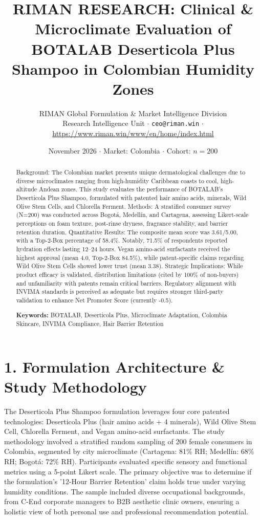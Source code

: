 \documentclass[10pt,twocolumn,a4paper]{article}
\title{\textbf{RIMAN RESEARCH: Clinical \& Microclimate Evaluation of BOTALAB Deserticola Plus Shampoo in Colombian Humidity Zones}}
\author{RIMAN Global Formulation \& Market Intelligence Division\\
\small Research Intelligence Unit $\cdot$ \texttt{ceo@riman.win} $\cdot$ \url{https://www.riman.win/www/en/home/index.html}}
\date{November 2026 \quad $\cdot$ \quad Market: Colombia \quad $\cdot$ \quad Cohort: $n = 200$}
\begin{document}
\maketitle

\begin{abstract}
Background: The Colombian market presents unique dermatological challenges due to diverse microclimates ranging from high-humidity Caribbean coasts to cool, high-altitude Andean zones. This study evaluates the performance of BOTALAB's Deserticola Plus Shampoo, formulated with patented hair amino acids, minerals, Wild Olive Stem Cells, and Chlorella Ferment. Methods: A stratified consumer survey (N=200) was conducted across Bogotá, Medellín, and Cartagena, assessing Likert-scale perceptions on foam texture, post-rinse dryness, fragrance stability, and barrier retention duration. Quantitative Results: The composite mean score was 3.61/5.00, with a Top-2-Box percentage of 58.4\%. Notably, 71.5\% of respondents reported hydration effects lasting 12–24 hours. Vegan amino-acid surfactants received the highest approval (mean 4.0, Top-2-Box 84.5\%), while patent-specific claims regarding Wild Olive Stem Cells showed lower trust (mean 3.38). Strategic Implications: While product efficacy is validated, distribution limitations (cited by 100\% of non-buyers) and unfamiliarity with patents remain critical barriers. Regulatory alignment with INVIMA standards is perceived as adequate but requires stronger third-party validation to enhance Net Promoter Score (currently -0.5).

\vspace{0.4em}
\noindent\textbf{Keywords:} BOTALAB, Deserticola Plus, Microclimate Adaptation, Colombia Skincare, INVIMA Compliance, Hair Barrier Retention
\end{abstract}

\section{1. Formulation Architecture \& Study Methodology}
The Deserticola Plus Shampoo formulation leverages four core patented technologies: Deserticola Plus (hair amino acids + 4 minerals), Wild Olive Stem Cell, Chlorella Ferment, and Vegan amino-acid surfactants. The study methodology involved a stratified random sampling of 200 female consumers in Colombia, segmented by city microclimate (Cartagena: 81\% RH; Medellín: 68\% RH; Bogotá: 72\% RH). Participants evaluated specific sensory and functional metrics using a 5-point Likert scale. The primary objective was to determine if the formulation's '12-Hour Barrier Retention' claim holds true under varying humidity conditions. The sample included diverse occupational backgrounds, from C-End corporate managers to B2B aesthetic clinic owners, ensuring a holistic view of both personal use and professional recommendation potential.
\end{document}
